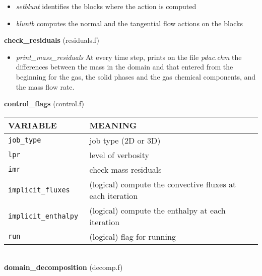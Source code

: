 \begin{itemize}
\item {\em setblunt} identifies the blocks where the action is computed 
\item {\em bluntb} computes the normal and the tangential flow actions on the blocks
\end{itemize}
%
%
{\large {\bf check\_residuals}} (residuals.f)\\
\begin{itemize}
\item {\em print\_mass\_residuals} At every time step, prints on the file {\em pdac.chm} the differences 
between the mass in the domain and that entered from the beginning for the gas, the solid phases and the 
gas chemical components, and the mass flow rate.
\end{itemize}
%
%
{\large {\bf control\_flags}} (control.f)\\[5mm]
\begin{tabular}{|p{6cm}|p{6cm}|}\hline
VARIABLE & MEANING\\\hline
\tt  job\_type    & job type (2D or 3D) \\\hline
\tt  lpr          & level of verbosity \\\hline
\tt  imr          & check mass residuals \\\hline
\tt  implicit\_fluxes   & (logical) compute the convective fluxes at each iteration \\\hline
\tt  implicit\_enthalpy & (logical) compute the enthalpy at each iteration \\\hline
\tt  run                & (logical) flag for running\\\hline
\end{tabular}\\[5mm]
%
%
{\large{\bf domain\_decomposition}} (decomp.f)\\[5mm]
